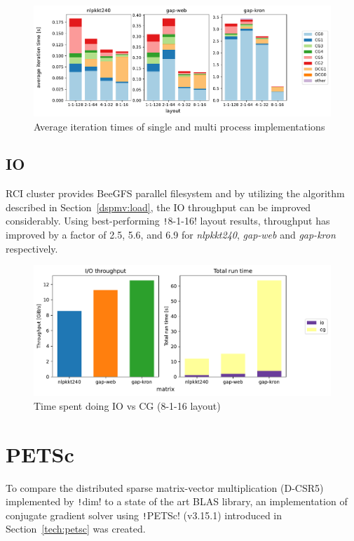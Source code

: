 \documentclass[thesis=M,english]{FITthesis}[2019/12/23]
\newcommand{\csre}[1]{\texttt!#1!}
\begin{document}
\begin{figure}[htp]
    \centering
    \includegraphics[scale=0.5]{static/mpi.pdf}
    \caption{Average iteration times of single and multi process implementations}
\end{figure}

\subsection{IO}

RCI cluster provides BeeGFS parallel filesystem and by utilizing the algorithm described in
Section~\ref{dspmv:load}, the IO throughput can be improved considerably. Using best-performing \csre{8-1-16}
layout results, throughput has improved by a factor of 2.5, 5.6, and 6.9 for \textit{nlpkkt240}, \textit{gap-web}
and \textit{gap-kron} respectively.

\begin{figure}[htp]
    \centering
    \includegraphics[scale=0.58]{static/io_mp.pdf}
    \caption{Time spent doing IO vs CG (8-1-16 layout)}
\end{figure}

\section{PETSc}

To compare the distributed sparse matrix-vector multiplication (D-CSR5) implemented by \csre{dim}
to a state of the art BLAS library, an
implementation of conjugate gradient solver using \csre{PETSc} (v3.15.1) introduced in
Section~\ref{tech:petsc} was created.
\end{document}
